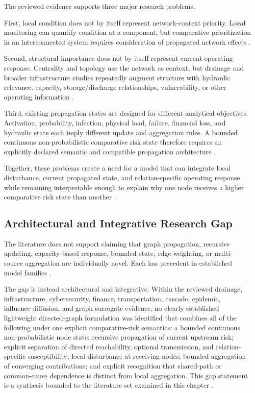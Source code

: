 The reviewed evidence supports three major research problems.

First, local condition does not by itself represent network-context
priority. Local monitoring can quantify condition at a component, but
comparative prioritization in an interconnected system requires
consideration of propagated network effects
\citep{iqbal2021,vandaele2024,simone2022,dastgir2023}.

Second, structural importance does not by itself represent current
operating response. Centrality and topology use the network as context,
but drainage and broader infrastructure studies repeatedly augment
structure with hydraulic relevance, capacity, storage/discharge
relationships, vulnerability, or other operating information
\citep{simone2022,dastgir2023,meijer2023,buldyrev2010,faraji2026}.

Third, existing propagation states are designed for different analytical
objectives. Activation, probability, infection, physical load, failure,
financial loss, and hydraulic state each imply different update and
aggregation rules. A bounded continuous non-probabilistic comparative
risk state therefore requires an explicitly declared semantic and
compatible propagation architecture \citep{kempe2003,kermack1927,
sheyner2002,buldyrev2010,faraji2026,zhang2024}.

Together, these problems create a need for a model that can integrate
local disturbance, current propagated state, and relation-specific
operating response while remaining interpretable enough to explain why
one node receives a higher comparative risk state than another
\citep{simone2022,dastgir2023,meijer2023,zhang2024}.

\subsection{Architectural and Integrative Research
Gap}\label{architectural-and-integrative-research-gap}

The literature does not support claiming that graph propagation,
recursive updating, capacity-based response, bounded state, edge
weighting, or multi-source aggregation are individually novel. Each has
precedent in established model families \citep{kempe2003,buldyrev2010,
munoz2017,faraji2026,petrone2018}.

The gap is instead architectural and integrative. Within the reviewed
drainage, infrastructure, cybersecurity, finance, transportation,
cascade, epidemic, influence-diffusion, and graph-surrogate evidence, no
clearly established lightweight directed-graph formulation was
identified that combines all of the following under one explicit
comparative-risk semantics: a bounded continuous non-probabilistic node
state; recursive propagation of current upstream risk; explicit
separation of directed reachability, optional transmission, and
relation-specific susceptibility; local disturbance at receiving nodes;
bounded aggregation of converging contributions; and explicit
recognition that shared-path or common-cause dependence is distinct from
local aggregation. This gap statement is a synthesis bounded to the
literature set examined in this chapter \citep{simone2022,dastgir2023,
meijer2023,zhang2025,kempe2003,buldyrev2010,sheyner2002}.


